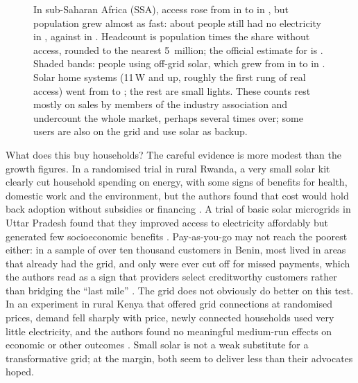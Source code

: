 \begin{figure}[htbp]
\centering

\caption{ In sub-Saharan Africa (SSA), access rose from
\sspElecAccessStart{} in \sspElecStartYear{} to \sspElecAccess{} in
\sspElecYear{}, but population grew almost as fast: about
\sspWithoutElec{} people still had no electricity in \sspElecYear{}, against
\sspWithoutElecStart{} in \sspElecStartYear{}. Headcount is population times
the share without access, rounded to the nearest 5~million; the official
estimate for \sspElecYear{} is \sdgWithoutElecSSA{} \parencite{esmap2026sdg7}.
Shaded bands: people using off-grid solar, which grew from
\sspSolarUsersStart{} in \sspSolarStartYear{} to \sspSolarUsers{} in
\sspSolarYear{}. Solar home systems (11\,W and up, roughly the first rung of
real access) went from \sspShsUsersStart{} to \sspShsUsers{}; the rest are
small lights. These counts rest mostly on sales by members of the industry
association and undercount the whole market, perhaps several times over; some
users are also on the grid and use solar as backup.
}
\label{fig:electricity-access}
\end{figure}
What does this buy households? The careful evidence is more modest than the
growth figures. In a randomised trial in rural Rwanda, a very small solar kit
clearly cut household spending on energy, with some signs of benefits for
health, domestic work and the environment, but the authors found that cost
would hold back adoption without subsidies or financing \parencite{grimm2017}.
A trial of basic solar microgrids in Uttar Pradesh found that they improved
access to electricity affordably but generated few socioeconomic benefits
\parencite{aklin2017}. Pay-as-you-go may not reach the poorest either: in a
sample of over ten thousand customers in Benin, most lived in areas that
already had the grid, and only \paygDisabledShare{} were ever cut off for
missed payments, which the authors read as a sign that providers select
creditworthy customers rather than bridging the ``last mile''
\parencite{barry2020}. The grid does not obviously do better on this test.
In an experiment in rural Kenya that offered grid connections at randomised
prices, demand fell sharply with price, newly connected households used very
little electricity, and the authors found no meaningful medium-run effects on
economic or other outcomes \parencite{lee2020}. Small solar is not a weak
substitute for a transformative grid; at the margin, both seem to deliver less
than their advocates hoped.


